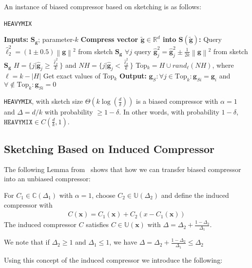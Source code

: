 An instance of biased compressor based on sketching is as follows:
\begin{algorithm}[H]
\caption{\texttt{HEAVYMIX}~\cite{ivkin2019communication} }\label{Alg:sketch}
\begin{algorithmic}[1]
\State \textbf{Inputs:} $\mathbf{S}_{\mathbf{g}}$; parameter-$k$
\State \textbf{Compress vector $\tilde{\mathbf{g}}\in\mathbb{R}^{d}$ into $\mathbf{S}\left(\tilde{\mathbf{g}}\right)$:}
\State Query $\hat{\ell}_2^2=\left(1\pm 0.5\right)\left\|\mathbf{g}\right\|^2$ from sketch $\mathbf{S}_{\mathbf{g}}$
\State $\forall j$ query $\hat{\mathbf{g}}_j^2=\hat{\mathbf{g}}_j^2\pm \frac{1}{2k}\left\|\mathbf{g}\right\|^2$ from sketch $\mathbf{S}_{\mathbf{g}}$
\State $H=\{j|\hat{\mathbf{g}}_j\geq \frac{\hat{\ell}_2^2}{k}\}$ and $NH=\{j|\hat{\mathbf{g}}_j<\frac{\hat{\ell}_2^2}{k}\}$
\State Top$_k=H\cup rand_\ell(NH)$, where $\ell=k-\left|H\right|$
\State Get exact values of Top$_k$ 
\State \textbf{Output:} $\mathbf{g}_S:\forall j\in\text{Top}_k:\mathbf{g}_{Si}=\mathbf{g}_{i}$ and $\forall\notin\text{Top}_k: \mathbf{g}_{Si}=0$
\end{algorithmic}
\end{algorithm}

\begin{lemma}
\texttt{HEAVYMIX}, with sketch size $\Theta\left(k\log\left(\frac{d}{\delta}\right)\right)$ is a biased compressor with $\alpha=1$ and  $\Delta=d/k$ with probability $\geq1-\delta$. In other words, with probability $1-\delta$, $\texttt{HEAVYMIX}\in C(\frac{d}{k},1)$. 
\end{lemma}
\subsection{Sketching Based on Induced Compressor}
The following Lemma from~\cite{horvath2020better} shows that how we can transfer biased compressor into an unbiased compressor: 
\begin{lemma}\label{lemm:induced_compress}
For $C_1\in \mathbb{C}(\Delta_1)$ with $\alpha=1$, choose $C_2\in \mathbb{U}(\Delta_2)$ and define the induced compressor with
\begin{align}
    C(\mathbf{x})=C_1(\mathbf{x})+C_2\left(x-C_1\left(\mathbf{x}\right)\right)
\end{align}
The induced compressor $C$ satisfies $C\in\mathbb{U}(\mathbf{x})$ with $\Delta=\Delta_2+\frac{1-\Delta_2}{\Delta_1}$.
\end{lemma}
\begin{remark}
We note that if $\Delta_2\geq 1$ and $\Delta_1\leq 1$, we have $\Delta=\Delta_2+\frac{1-\Delta_2}{\Delta_1}\leq \Delta_2$
\end{remark}
Using this concept of the induced compressor we introduce the following:


